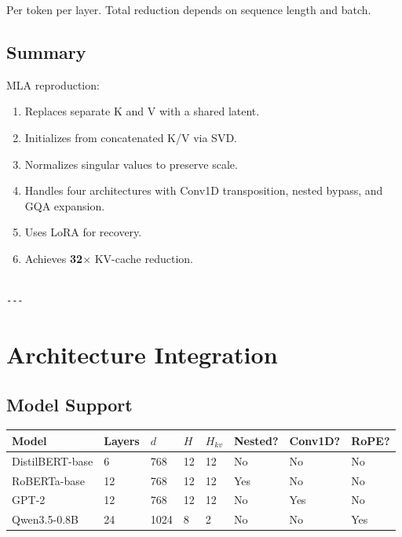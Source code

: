 Per token per layer. Total reduction depends on sequence length and batch.

\subsection{Summary}

MLA reproduction:
\begin{enumerate}
\item Replaces separate K and V with a shared latent.
\item Initializes from concatenated K/V via SVD.
\item Normalizes singular values to preserve scale.
\item Handles four architectures with Conv1D transposition, nested bypass, and
  GQA expansion.
\item Uses LoRA for recovery.
\item Achieves \textbf{32$\times$} KV-cache reduction.
\end{enumerate}
\begin{lstlisting}

---
\end{lstlisting}


\section{Architecture Integration}

\subsection{Model Support}

\begin{table}[H]
\centering
\small
\begin{tabular}{llllllll}
\toprule
\textbf{Model} & \textbf{Layers} & \textbf{$d$} & \textbf{$H$} & \textbf{$H_{kv}$} & \textbf{Nested?} & \textbf{Conv1D?} & \textbf{RoPE?} \\
\midrule
DistilBERT-base & 6 & 768 & 12 & 12 & No & No & No \\
RoBERTa-base & 12 & 768 & 12 & 12 & Yes & No & No \\
GPT-2 & 12 & 768 & 12 & 12 & No & Yes & No \\
Qwen3.5-0.8B & 24 & 1024 & 8 & 2 & No & No & Yes \\
\bottomrule
\end{tabular}
\end{table}

